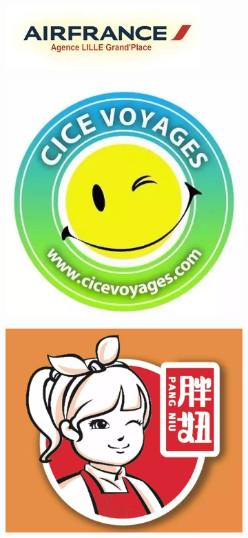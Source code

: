 \documentclass[11pt,fleqn]{book} %
\begin{document}
\begin{center}
\begin{figure}[h]
  \centering
  \begin{subfigure}[t]{0.25\textwidth}
    \centering\includegraphics[width=\textwidth]{img/airfrance.jpg}
  \end{subfigure}
  \begin{subfigure}[t]{0.25\textwidth}
    \centering\includegraphics[width=\textwidth]{img/cice.jpg}
  \end{subfigure}
  \begin{subfigure}[t]{0.25\textwidth}
    \centering\includegraphics[width=\textwidth]{img/pangniu.jpg}

\end{subfigure}
\end{figure}
\end{center}
\end{document}
